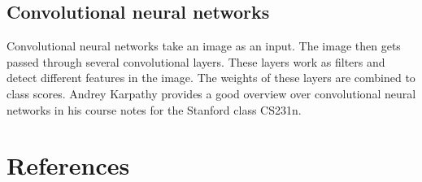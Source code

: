 \documentclass[11pt]{article}
\begin{document}
\subsection{Convolutional neural networks}
\label{subsec:cnn}
Convolutional neural networks take an image as an input. The image then gets passed through several convolutional layers. These layers work as filters and detect different features in the image. The weights of these layers are combined to class scores. Andrey Karpathy provides a good overview over convolutional neural networks in his course notes for the Stanford class CS231n. \cite{cnn}





\newpage
\section*{References}

\printbibliography

\newpage
\listoffigures
\end{document}
